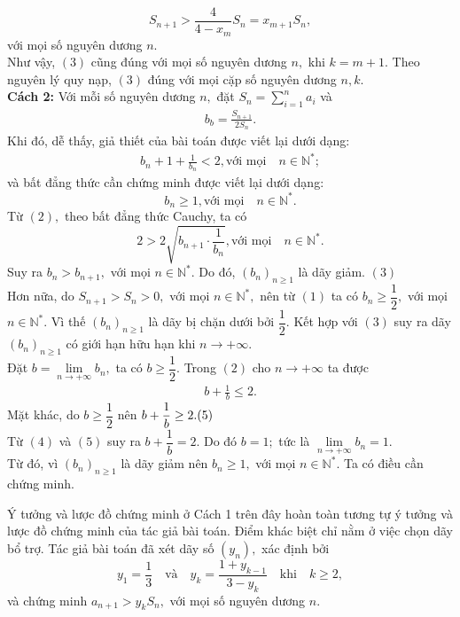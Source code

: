 \begin{bt}
{		$$ S_{n+1}>\frac{4}{4-x_m}S_n=x_{m+1}S_n, $$ với mọi số nguyên dương $n.$\\
		Như vậy, $(3)$ cũng đúng với mọi số nguyên dương $n,$ khi $k=m+1.$ Theo nguyên lý quy nạp, $(3)$ đúng với mọi cặp số nguyên dương $n, k.$\\		
		\textbf{Cách 2:} 
		Với mỗi số nguyên dương $n,$ đặt $S_n=\sum\limits_{i=1}^n a_i$ và 
		\begin{align*}  b_b=\frac{S_{n+1}}{2S_n} . \tag{1}\end{align*} Khi đó, dễ thấy, giả thiết của bài toán được viết lại dưới dạng:
		\begin{align*}  b_n+1 +\frac{1}{b_n}<2, \text{với mọi} \quad n\in \mathbb{N^*}; \tag{2}\end{align*} và bất đẳng thức cần chứng minh được viết lại dưới dạng:
		$$ b_n\geq 1,\text{với mọi} \quad n\in \mathbb{N^*}. $$
		Từ $(2),$ theo bất đẳng thức Cauchy, ta có
		$$ 2>2\sqrt{b_{n+1}\cdot \frac{1}{b_n}}, \text{với mọi} \quad n\in \mathbb{N^*}.$$
		Suy ra $b_n>b_{n+1},$ với mọi $n\in \mathbb{N^*}.$ Do đó, $(b_n)_{n\geq 1}$ là dãy giảm. $(3)$\\
		Hơn nữa, do $S_{n+1}>S_n>0,$ với mọi  $n\in \mathbb{N^*},$ nên từ $(1)$ ta có $b_n\geq \dfrac{1}{2},$  với mọi  $n\in \mathbb{N^*}.$ Vì thế $(b_n)_{n\geq 1}$ là dãy bị chặn dưới bởi $\dfrac{1}{2}.$ Kết hợp với $(3)$ suy ra dãy $(b_n)_{n\geq 1}$ có giới hạn hữu hạn khi $n\to +\infty.$\\
		Đặt $b=\lim\limits_{n\to +\infty}b_n,$ ta có $b\geq \dfrac{1}{2}.$ Trong $(2)$ cho $n\to +\infty$ ta được 
		\begin{align*}  b+\frac{1}{b}\leq 2. \tag{4}\end{align*} Mặt khác, do $b\geq \dfrac{1}{2}$ nên $ b+\dfrac{1}{b}\geq 2. \hfill (5)$\\
		Từ $(4)$ và $(5)$ suy ra $b+\dfrac{1}{b}=2.$ Do đó $b=1;$ tức là  $\lim\limits_{n\to +\infty}b_n=1.$ \\
		Từ đó, vì $(b_n)_{n\geq 1}$ là dãy giảm nên $b_n\geq 1,$ với mọi $n\in \mathbb{N^*}.$ Ta có điều cần chứng minh.
		\begin{nx}
			Ý tưởng và lược đồ chứng minh ở Cách 1 trên đây hoàn toàn tương tự ý tưởng và lược đồ chứng minh của tác giả bài toán. Điểm khác biệt chỉ nằm ở việc chọn dãy bổ trợ. Tác giả bài toán đã xét dãy số $(y_n),$ xác định bởi
			$$ y_1=\frac{1}{3} \quad \text{và} \quad y_k=\frac{1+y_{k-1}}{3-y_k}\quad \text{khi} \quad k\geq 2, $$ và chứng minh $a_{n+1}>y_kS_n,$ với mọi số nguyên dương $n.$ 
		\end{nx}
	}
\end{bt}
